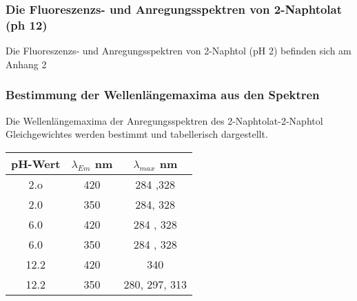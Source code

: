 \documentclass[12pt]{article}
\newcommand\addplotiso{\directlua{drawISO()}}
\newcommand\addplotaa{\directlua{drawISO2()}}
\begin{document}
\subsubsection{Die Fluoreszenzs- und Anregungsspektren von 2-Naphtolat (ph 12)}
Die Fluoreszenzs- und Anregungsspektren von 2-Naphtol (pH 2) befinden sich am Anhang 2


\subsubsection{Bestimmung der Wellenlängemaxima aus den Spektren}
Die Wellenlängemaxima der Anregungsspektren des 2-Naphtolat-2-Naphtol Gleichgewichtes werden bestimmt und tabellerisch dargestellt.
\begin{table}[!htbp]
  \begin{tabular}{ccc}
    pH-Wert & $\lambda_{Em}$ \si{\nano\meter} & $\lambda_{max}$ \si{\nano\meter}  \\
    \hline
    2.o& 420 & 284 ,328\\
    2.0& 350 & 284, 328\\
    6.0& 420 & 284 , 328\\
    6.0& 350 & 284 , 328\\
    12.2& 420 & 340\\
    12.2& 350 & 280, 297, 313\\
  \end{tabular}
\end{table}
\end{document}
